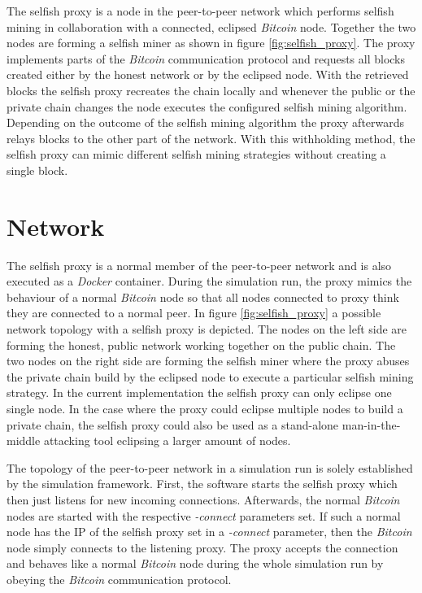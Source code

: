 The selfish proxy is a node in the peer-to-peer network which performs selfish mining in collaboration with a connected, eclipsed \textit{Bitcoin} node.
Together the two nodes are forming a selfish miner as shown in figure \ref{fig:selfish_proxy}.
The proxy implements parts of the \textit{Bitcoin} communication protocol and requests all blocks created either by the honest network or by the eclipsed node.
With the retrieved blocks the selfish proxy recreates the chain locally and whenever the public or the private chain changes the node executes the configured selfish mining algorithm.
Depending on the outcome of the selfish mining algorithm the proxy afterwards relays blocks to the other part of the network.
With this withholding method, the selfish proxy can mimic different selfish mining strategies without creating a single block.

\section{Network}

The selfish proxy is a normal member of the peer-to-peer network and is also executed as a \textit{Docker} container.
During the simulation run, the proxy mimics the behaviour of a normal \textit{Bitcoin} node so that all nodes connected to proxy think they are connected to a normal peer.
In figure \ref{fig:selfish_proxy} a possible network topology with a selfish proxy is depicted.
The nodes on the left side are forming the honest, public network working together on the public chain.
The two nodes on the right side are forming the selfish miner where the proxy abuses the private chain build by the eclipsed node to execute a particular selfish mining strategy.
In the current implementation the selfish proxy can only eclipse one single node.
In the case where the proxy could eclipse multiple nodes to build a private chain, the selfish proxy could also be used as a stand-alone man-in-the-middle attacking tool eclipsing a larger amount of nodes.

The topology of the peer-to-peer network in a simulation run is solely established by the simulation framework.
First, the software starts the selfish proxy which then just listens for new incoming connections.
Afterwards, the normal \textit{Bitcoin} nodes are started with the respective \textit{-connect} parameters set.
If such a normal node has the IP of the selfish proxy set in a \textit{-connect} parameter, then the \textit{Bitcoin} node simply connects to the listening proxy.
The proxy accepts the connection and behaves like a normal \textit{Bitcoin} node during the whole simulation run by obeying the \textit{Bitcoin} communication protocol.

